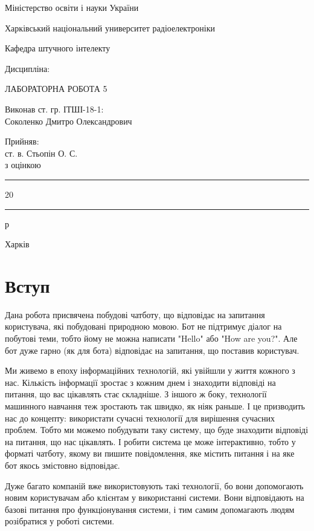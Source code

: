 \documentclass[a4paper,14pt]{extreport}
\newcommand\chap[1]{%
  \chapter*{#1}%
  \addcontentsline{toc}{chapter}{#1}}
\begin{document}
\begin{titlepage}
	\centering
    Міністерство освіти і науки України
    
    Харківський національний университет радіоелектроніки

    \vspace{1cm}
    Кафедра штучного інтелекту

    \vspace{2cm}
    Дисципліна: 

    \vspace{2cm}
    \uppercase{Лабораторна робота 5}

    
    \uppercase{}

    \vspace{4cm}
    \begin{minipage}[t]{10cm}
        Виконав ст. гр. ІТШІ-18-1:\\
        Соколенко Дмитро Олександрович
    \end{minipage}
    \hfill
    \begin{minipage}[t]{6cm}
        Прийняв:\\
        ст. в. Стьопін О. С.\\
        з оцінкою \say{\rule{2cm}{0.15mm}}\\
        \say{\rule{0.7cm}{0.15mm}}\rule{2cm}{0.15mm}20\rule{0.7cm}{0.15mm}р
    \end{minipage}

	\vfill

	{Харків \the\year{}}
\end{titlepage}

\tableofcontents
\newpage

\setcounter{page}{3}
\chap{Вступ}
    \par Дана робота присвячена побудові чатботу, що відповідає на запитання користувача, які побудовані природною мовою. Бот не підтримує діалог на побутові теми, тобто йому не можна написати "Hello" або "How are you?". Але бот дуже гарно (як для бота) відповідає на запитання, що поставив користувач. \par
    Ми живемо в епоху інформаційних технологій, які увійшли у життя кожного з нас. Кількість інформації зростає з кожним днем і знаходити відповіді на питання, що вас цікавлять стає складніше. З іншого ж боку, технології машинного навчання теж зростають так швидко, як ніяк раньше. І це призводить нас до концепту: використати сучасні технології для вирішення сучасних проблем. Тобто ми можемо побудувати таку систему, що буде знаходити відповіді на питання, що нас цікавлять. І робити система це може інтерактивно, тобто у форматі чатботу, якому ви пишите повідомлення, яке містить питання і на яке бот якось змістовно відповідає. \par
    Дуже багато компаній вже використовують такі технології, бо вони допомогають новим користувачам або клієнтам у використанні системи. Вони відповідають на базові питання про функціонування системи, і тим самим допомагають людям розібратися у роботі системи. 
\end{document}
